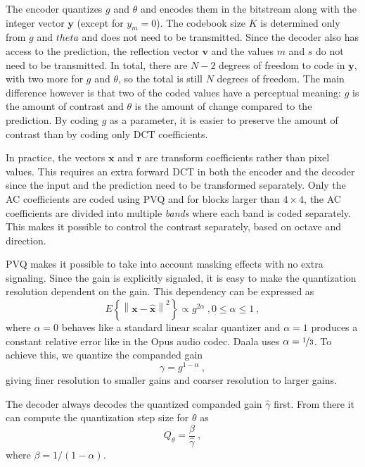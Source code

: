 \documentclass[english,conference,10pt]{IEEEtran}
\begin{document}
The encoder quantizes $g$ and $\theta$ and encodes them in the bitstream along
with the integer vector $\mathbf{y}$ (except for $y_m=0$). The codebook
size $K$ is determined only from $g$ and $theta$ and does not need to be
transmitted. Since the decoder also has access to the prediction, the
reflection vector $\mathbf{v}$ and the values $m$ and $s$ do not need to
be transmitted. In total, there are $N-2$ degrees of freedom to code in
$\mathbf{y}$, with two more for $g$ and $\theta$, so the total is still
$N$ degrees of freedom. The main difference however is that two of the
coded values have a perceptual meaning: $g$ is the amount of contrast and
$\theta$ is the amount of change compared to the prediction. By coding $g$
as a parameter, it is easier to preserve the amount of contrast than by
coding only DCT coefficients.

In practice, the vectors $\mathbf{x}$ and $\mathbf{r}$ are transform
coefficients rather than pixel values. This requires an extra forward DCT
in both the encoder and the decoder since the input and the prediction need
to be transformed separately. Only the AC coefficients are coded using PVQ
and for blocks larger than $4\times 4$, the AC coefficients are divided into multiple
\textit{bands} where each band is coded separately. This makes it possible
to control the contrast separately, based on octave and direction.

PVQ makes it possible to take into account masking effects with no
extra signaling. Since the gain is explicitly signaled, it is easy to make
the quantization resolution dependent on the gain. This dependency can be
expressed as
\begin{equation}
E\left\lbrace \left\| \mathbf{x} - \hat{\mathbf{x}} \right\|^2 \right\rbrace
\propto g^{2\alpha}\ , 0 \leq \alpha \leq 1\ ,
\end{equation}
where $\alpha=0$ behaves like a standard linear scalar quantizer and
$\alpha=1$ produces a constant relative error like in the Opus audio codec.
Daala uses $\alpha = \nicefrac{1}{3}$. To achieve this, we quantize the
companded gain
\begin{equation}
\gamma = g^{1-\alpha}\ ,
\end{equation}
giving finer resolution to smaller gains and coarser resolution to larger
gains.

The decoder always decodes the quantized companded gain $\hat{\gamma}$
first. From there it can compute the quantization step size for $\theta$ as
\begin{equation}
Q_\theta = \frac{\beta}{\hat{\gamma}}\ ,
\end{equation}
where $\beta = 1/(1-\alpha)$.
\end{document}
